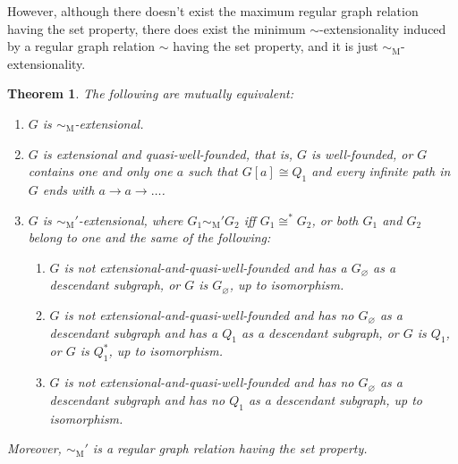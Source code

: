 \documentclass{amsart}
\newtheorem{theorem}{Theorem}
\begin{document}
However, although there doesn't exist the maximum regular graph relation having the set property, there does exist the minimum $\sim$-extensionality induced by a regular graph relation $\sim$ having the set property, and it is just $\sim_\mathrm{M}$-extensionality.

\begin{theorem}
    The following are mutually equivalent:
    \begin{enumerate}[label=(\Roman*)]
        \item $G$ is $\sim_\mathrm{M}$-extensional.
        \item $G$ is extensional and quasi-well-founded, that is, $G$ is well-founded, or $G$ contains one and only one $a$ such that $G[a]\cong Q_1$ and every infinite path in $G$ ends with $a \to a \to\dots$.
        \item $G$ is $\sim_\mathrm{M}'$-extensional, where $G_1 \sim_\mathrm{M}' G_2$ iff $G_1 \cong^* G_2$, or both $G_1$ and $G_2$ belong to one and the same of the following:
        \begin{enumerate}[label=(Class \arabic*)]
            \item $G$ is not extensional-and-quasi-well-founded and has a $G_\varnothing$ as a descendant subgraph, or $G$ is $G_\varnothing$, up to isomorphism.
            \item $G$ is not extensional-and-quasi-well-founded and has no $G_\varnothing$ as a descendant subgraph and has a $Q_1$ as a descendant subgraph, or $G$ is $Q_1$, or $G$ is $Q_1^*$, up to isomorphism.
            \item $G$ is not extensional-and-quasi-well-founded and has no $G_\varnothing$ as a descendant subgraph and has no $Q_1$ as a descendant subgraph, up to isomorphism.
        \end{enumerate}
    \end{enumerate}
    Moreover, $\sim_\mathrm{M}'$ is a regular graph relation having the set property. 
\end{theorem}
\end{document}
